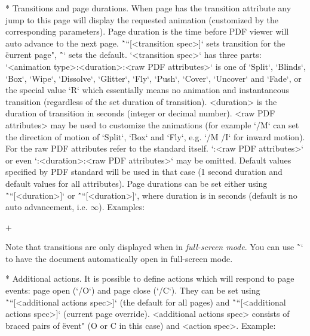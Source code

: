 \begitems
* Transitions and page durations. When page has the transition attribute any
jump to this page will display the requested animation (customized by the
corresponding parameters). Page duration is the time before PDF viewer will auto
advance to the next page. \^`\transition``[<transition spec>]` sets transition
for the \"current page", \^`\transitions` sets the default.
`<transition spec>` has three parts:\nl\indent
`<animation type>:<duration>:<raw PDF attributes>`\nl
{} is one of `Split`, `Blinds`, `Box`, `Wipe`,
`Dissolve`, `Glitter`, `Fly`, `Push`, `Cover`, `Uncover` and `Fade`, or the
special value `R` which essentially means no animation and instantaneous
transition (regardless of the set duration of transition). <duration> is the
duration of transition in seconds (integer or decimal number).
<raw PDF attributes> may be used to customize
the animations (for example `/M` can set the direction of motion of `Split`,
`Box` and `Fly`, e.g. `/M /I` for inward motion). For the raw PDF attributes
refer to the standard
itself.
`:<raw PDF attributes>` or even `:<duration>:<raw PDF attributes>` may be omitted.
Default values specified by PDF standard will be used in that case (1 second
duration and default values for all attributes). Page durations can be set
either using \^```[<duration>]` or
\^`\pageduration``[<duration>]`, where duration is in seconds (default is no auto
advancement, i.e. $\infty$).
Examples:

\begtt
\transitions[Wipe:1]

\transition[Fade]

\pg+ %

\transition[Split:3:/Dm /V /M /I]
\endtt

Note that transitions are only displayed when in {\em full-screen mode}. You
can use \~`\fullscreen` to have the document automatically open in full-screen
mode.

* Additional actions. It is possible to define actions which will respond to
page events: page open (`/O`) and page close (`/C`). They can be set using
\^```[<additional actions spec>]` (the default for all pages) and
\^`\pageactions``[<additional actions spec>]` (current page override).
<additional actions spec> consists of braced pairs of \"event" (O or C in this
case) and <action spec>. Example:

